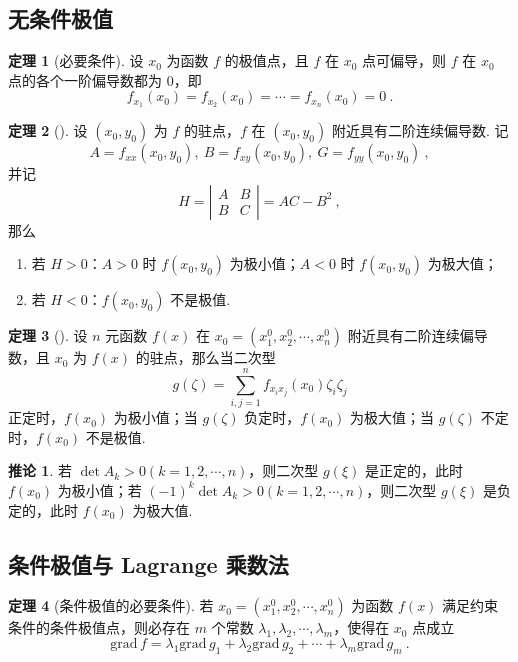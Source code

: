 \documentclass[zihao=-4,linespread=1.8,UTF8,nothm]{aytony_base}
\theoremstyle{definition}
\newtheorem{theorem}{\indent\heiti\textbf{定理}}[subsection]
\newtheorem*{corollary}{\indent\heiti\textbf{推论}}
\begin{document}
\subsection{无条件极值}

\begin{theorem}[必要条件]
    设 $x_0$ 为函数 $f$ 的极值点，且 $f$ 在 $x_0$ 点可偏导，则 $f$ 在 $x_0$ 点的各个一阶偏导数都为 $0$，即 $$
        f_{x_1}(x_0) = f_{x_2}(x_0) = \cdots = f_{x_n}(x_0) = 0\ .
    $$
\end{theorem}

\begin{theorem}[]
    设 $(x_0, y_0)$ 为 $f$ 的驻点，$f$ 在 $(x_0, y_0)$ 附近具有二阶连续偏导数. 记 $$
        A = f_{xx}(x_0, y_0),\ B = f_{xy}(x_0, y_0),\ G = f_{yy}(x_0, y_0)\ ,
    $$ 并记 $$
        H = \left|
        \begin{matrix}
            A & B \\
            B & C
        \end{matrix}
        \right| = AC - B^2\ ,
    $$ 那么
    \begin{enumerate}[nosep]
        \item 若 $H > 0$：$A > 0$ 时 $f(x_0, y_0)$ 为极小值；$A < 0$ 时 $f(x_0, y_0)$ 为极大值；
        \item 若 $H < 0$：$f(x_0, y_0)$ 不是极值.
    \end{enumerate}
\end{theorem}

\begin{theorem}[]
    设 $n$ 元函数 $f(x)$ 在 $x_0 = (x^0_1, x^0_2, \cdots, x^0_{n})$ 附近具有二阶连续偏导数，且 $x_0$ 为 $f(x)$ 的驻点，那么当二次型 $$
        g(\zeta) = \sum\limits_{i, j = 1}^{n}f_{x_ix_j}(x_0)\zeta_i\zeta_j
    $$ 正定时，$f(x_0)$ 为极小值；当 $g(\zeta)$ 负定时，$f(x_0)$ 为极大值；当 $g(\zeta)$ 不定时，$f(x_0)$ 不是极值.
\end{theorem}

\begin{corollary}
    若 $\det A_k > 0(k = 1, 2, \cdots, n)$，则二次型 $g(\xi)$ 是正定的，此时 $f(x_0)$ 为极小值；若 $(-1)^k\det A_k > 0(k = 1, 2, \cdots, n)$，则二次型 $g(\xi)$ 是负定的，此时 $f(x_0)$ 为极大值.
\end{corollary}

\subsection{条件极值与 Lagrange 乘数法}

\begin{theorem}[条件极值的必要条件]
    若 $x_0 = (x^0_1, x^0_2, \cdots, x^0_{n})$ 为函数 $f(x)$ 满足约束条件的条件极值点，则必存在 $m$ 个常数 ${\lambda}_1, {\lambda}_2, \cdots, {\lambda}_{m}$，使得在 $x_0$ 点成立 $$
        \mathrm{grad}\,f = {\lambda}_1 \mathrm{grad}\,g_1 + {\lambda}_2 \mathrm{grad}\,g_2 + \cdots+ {\lambda}_m \mathrm{grad}\,g_m\ .
    $$
\end{theorem}
\end{document}
